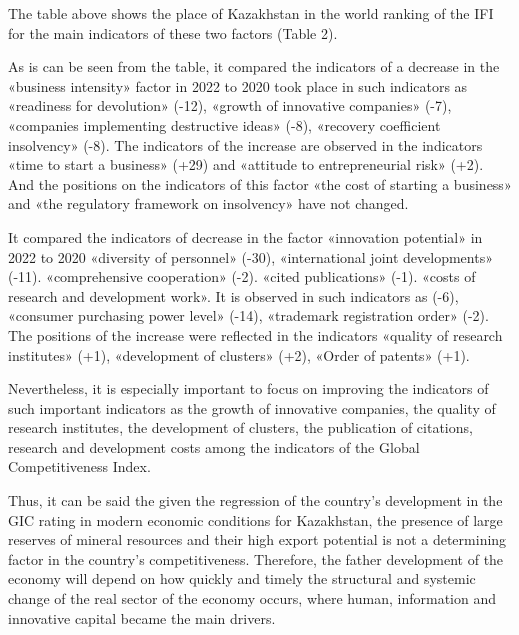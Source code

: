 \begin{multicols}{2}
The table above shows the place of Kazakhstan in the world ranking of
the IFI for the main indicators of these two factors (Table 2).

As is can be seen from the table, it compared the indicators of a
decrease in the «business intensity» factor in 2022 to 2020 took place
in such indicators as «readiness for devolution» (-12), «growth of
innovative companies» (-7), «companies implementing destructive ideas»
(-8), «recovery coefficient insolvency» (-8). The indicators of the
increase are observed in the indicators «time to start a business» (+29)
and «attitude to entrepreneurial risk» (+2). And the positions on the
indicators of this factor «the cost of starting a business» and «the
regulatory framework on insolvency» have not changed.

It compared the indicators of decrease in the factor «innovation
potential» in 2022 to 2020 «diversity of personnel» (-30),
«international joint developments» (-11). «comprehensive cooperation»
(-2). «cited publications» (-1). «costs of research and development
work». It is observed in such indicators as (-6), «consumer purchasing
power level» (-14), «trademark registration order» (-2). The positions
of the increase were reflected in the indicators «quality of research
institutes» (+1), «development of clusters» (+2), «Order of patents»
(+1).

Nevertheless, it is especially important to focus on improving the
indicators of such important indicators as the growth of innovative
companies, the quality of research institutes, the development of
clusters, the publication of citations, research and development costs
among the indicators of the Global Competitiveness Index.

Thus, it can be said the given the regression of the country's
development in the GIC rating in modern economic conditions for
Kazakhstan, the presence of large reserves of mineral resources and
their high export potential is not a determining factor in the country's
competitiveness. Therefore, the father development of the economy will
depend on how quickly and timely the structural and systemic change of
the real sector of the economy occurs, where human, information and
innovative capital became the main drivers.
\end{multicols}

